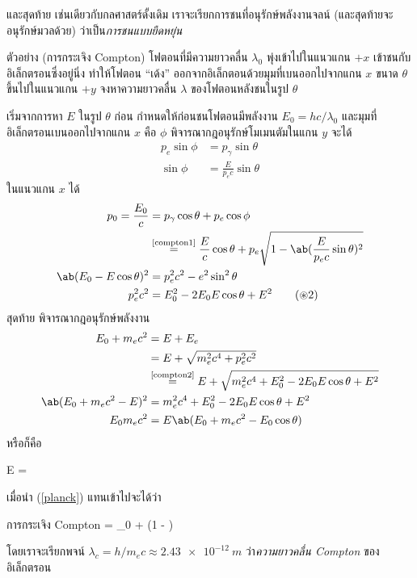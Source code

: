 และสุดท้าย เช่นเดียวกับกลศาสตร์ดั้งเดิม เราจะเรียกการชนที่อนุรักษ์พลังงานจลน์ (และสุดท้ายจะอนุรักษ์มวลด้วย) ว่าเป็น\emph{การชนแบบยืดหยุ่น}

\begin{corbox}{ตัวอย่าง (การกระเจิง Compton)}
    โฟตอนที่มีความยาวคลื่น $\lambda_0$ พุ่งเข้าไปในแนวแกน $+x$ เข้าชนกับอิเล็กตรอนซึ่งอยู่นิ่ง ทำให้โฟตอน ``เด้ง'' ออกจากอิเล็กตอนด้วยมุมที่เบนออกไปจากแกน $x$ ขนาด $\theta$ ขึ้นไปในแนวแกน $+y$ จงหาความยาวคลื่น $\lambda$ ของโฟตอนหลังชนในรูป $\theta$
\end{corbox}

\begin{soln}
    เริ่มจากการหา $E$ ในรูป $\theta$ ก่อน กำหนดให้ก่อนชนโฟตอนมีพลังงาน $E_0 = hc/\lambda_0$ และมุมที่อิเล็กตรอนเบนออกไปจากแกน $x$ คือ $\phi$ พิจารณากฎอนุรักษ์โมเมนตัมในแกน $y$ จะได้
    \begin{align*}
        p_e\sin\phi &= p_\gamma\sin\theta \\
        \sin\phi &= \frac{E}{p_ec}\sin\theta\tag{$\circledast$1}\label{compton1}
    \end{align*}
    ในแนวแกน $x$ ได้
    \begin{align*}
        p_0 = \frac{E_0}{c} &= p_\gamma\cos\theta + p_e\cos\phi \\
        &\overset{\text{\ref{compton1}}}{=} \frac{E}{c}\cos\theta + p_e\sqrt{1 - \ab(\frac{E}{p_ec}\sin\theta)^2}\\
        \ab(E_0 - E\cos\theta)^2 &= p_e^2c^2 - e^2\sin^2\theta\\
        p_e^2c^2 &= E_0^2 -2E_0E\cos\theta + E^2\tag{$\circledast$2}\label{compton2}
    \end{align*}
    สุดท้าย พิจารณากฎอนุรักษ์พลังงาน
    \begin{align*}
        E_0 + m_ec^2 &= E + E_e\\
        &= E + \sqrt{m_e^2c^4 + p_e^2c^2}\\
        &\overset{\text{\ref{compton2}}}{=} E + \sqrt{m_e^2c^4 + E_0^2 - 2E_0E\cos\theta + E^2}\\
        \ab(E_0 + m_ec^2 - E)^2 &= m_e^2c^4 + E_0^2 - 2E_0E\cos\theta + E^2\\
        E_0m_ec^2 &= E\ab(E_0 + m_ec^2 - E_0\cos\theta)
    \end{align*}
    หรือก็คือ
    \begin{eqnobox}
        E = 
    \end{eqnobox}
    เมื่อนำ (\ref{planck}) แทนเข้าไปจะได้ว่า
    \begin{eqbox}{การกระเจิง Compton}
        \lambda = \lambda_0 + \ab(1 - \cos\theta)
    \end{eqbox}
    โดยเราจะเรียกพจน์ $\lambda_c = h/m_ec \approx \qty{2.43e-12}{m}$ ว่า\emph{ความยาวคลื่น Compton} ของอิเล็กตรอน
\end{soln}

